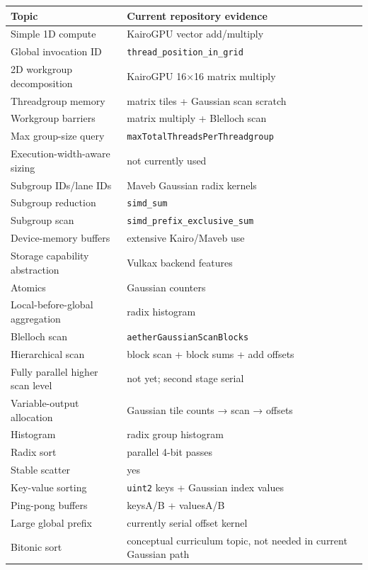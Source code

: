 {\def\LTcaptype{none} %
\begin{longtable}[]{@{}
  >{\raggedright\arraybackslash}p{}
  >{\raggedright\arraybackslash}p{}@{}}
\toprule\noalign{}
\begin{minipage}[b]{\linewidth}\raggedright
Topic
\end{minipage} & \begin{minipage}[b]{\linewidth}\raggedright
Current repository evidence
\end{minipage} \\
\midrule\noalign{}
\endhead
\bottomrule\noalign{}
\endlastfoot
Simple 1D compute & KairoGPU vector add/multiply \\
Global invocation ID & \texttt{thread\_position\_in\_grid} \\
2D workgroup decomposition & KairoGPU 16×16 matrix multiply \\
Threadgroup memory & matrix tiles + Gaussian scan scratch \\
Workgroup barriers & matrix multiply + Blelloch scan \\
Max group-size query & \texttt{maxTotalThreadsPerThreadgroup} \\
Execution-width-aware sizing & not currently used \\
Subgroup IDs/lane IDs & Maveb Gaussian radix kernels \\
Subgroup reduction & \texttt{simd\_sum} \\
Subgroup scan & \texttt{simd\_prefix\_exclusive\_sum} \\
Device-memory buffers & extensive Kairo/Maveb use \\
Storage capability abstraction & Vulkax backend features \\
Atomics & Gaussian counters \\
Local-before-global aggregation & radix histogram \\
Blelloch scan & \texttt{aetherGaussianScanBlocks} \\
Hierarchical scan & block scan + block sums + add offsets \\
Fully parallel higher scan level & not yet; second stage serial \\
Variable-output allocation & Gaussian tile counts → scan → offsets \\
Histogram & radix group histogram \\
Radix sort & 16 parallel 4-bit passes \\
Stable scatter & yes \\
Key-value sorting & \texttt{uint2} keys + Gaussian index values \\
Ping-pong buffers & keysA/B + valuesA/B \\
Large global prefix & currently serial offset kernel \\
Bitonic sort & conceptual curriculum topic, not needed in current Gaussian path \\
\end{longtable}
}

